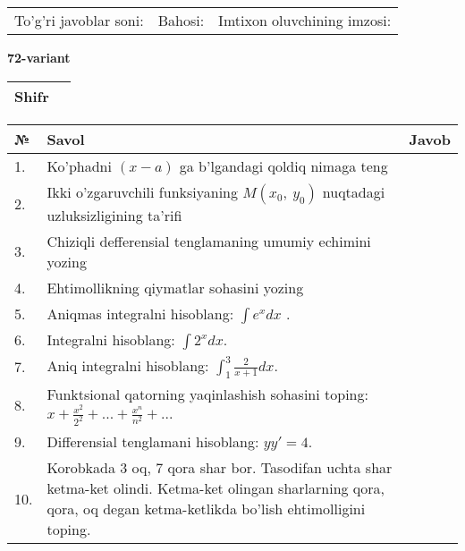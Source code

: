 \documentclass{article}
\begin{document}
  \vspace{1cm}
  
  \begin{tabular}{lll}
  To'g'ri javoblar soni: \underline{\hspace{1.5cm}} & 
  Bahosi: \underline{\hspace{1.5cm}} & 
  Imtixon oluvchining imzosi: \underline{\hspace{2cm}} \\
  \end{tabular}
  
  \egroup
  
  \newpage
  
  
  \textbf{72-variant}\\
  
  \bgroup
  \def\arraystretch{1.6} %
  
  \begin{tabular}{|m{5.7cm}|m{9.5cm}|}
  \hline
  Shifr & \\
  \hline
  \end{tabular}
  
  \vspace{1cm}
  
  \begin{tabular}{|m{0.7cm}|m{10cm}|m{4cm}|}
  \hline
  № & Savol & Javob \\
  \hline
  1. & Ko'phadni \((x - a)\) ga b'lgandagi qoldiq nimaga teng &  \\
  \hline
  2. & Ikki o'zgaruvchili funksiyaning \(M(x_{0},\ y_{0})\) nuqtadagi uzluksizligining ta'rifi &  \\
  \hline
  3. & Chiziqli defferensial tenglamaning umumiy echimini yozing &  \\
  \hline
  4. & Ehtimollikning qiymatlar sohasini yozing &  \\
  \hline
  5. & Aniqmas integralni hisoblang: \(\int {e^{x}dx}\) . &  \\
  \hline
  6. & Integralni hisoblang: \(\int {2^{x}dx}\). &  \\
  \hline
  7. & Aniq integralni hisoblang: \(\int_{1}^{3}\frac{2}{x + 1}dx\). &  \\
  \hline
  8. & Funktsional qatorning yaqinlashish sohasini toping: \(x + \frac{x^{2}}{2^{2}} + ... + \frac{x^{n}}{n^{2}} + ...\) &  \\
  \hline
  9. & Differensial tenglamani hisoblang: \(yy' = 4\). &  \\
  \hline
  10. & Korobkada 3 oq, 7 qora shar bor. Tasodifan uchta shar ketma-ket olindi. Ketma-ket olingan sharlarning qora, qora, oq degan ketma-ketlikda bo'lish ehtimolligini toping. &  \\
  \hline
  \end{tabular}
  
\end{document}
